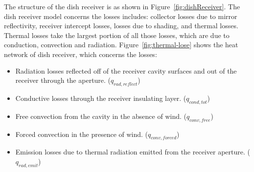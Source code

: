 \documentclass{article}
\begin{document}
The structure of the dish receiver is as shown in Figure~\ref{fig:dishReceiver}. The dish receiver model concerns the losses includes: collector losses due to mirror reflectivity, receiver intercept losses, losses due to shading, and thermal losses. Thermal losses take the largest portion of all those losses, which are due to conduction, convection and radiation. Figure~\ref{fig:thermal-lose} shows the heat network of dish receiver, which concerns the losses:
\begin{itemize}
	\item Radiation losses reflected off of the receiver cavity surfaces and out of the receiver through the aperture. ($q_{rad,reflect}$)
	\item Conductive losses through the receiver insulating layer. ($q_{cond,tot}$)
	\item Free convection from the cavity in the absence of wind. ($q_{conv,free}$)
	\item Forced convection in the presence of wind. ($q_{conv,forced}$)
	\item Emission losses due to thermal radiation emitted from the receiver aperture. ($q_{rad,emit}$)
\end{itemize}
\end{document}
